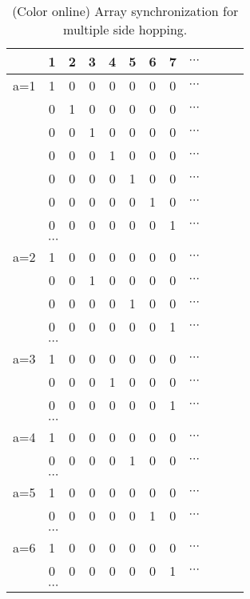 \documentclass[%
  twocolumn,
 showpacs,
 showkeys,
 preprintnumbers,
 amsmath,amssymb,
 aps,
 prl,
  longbibliography,
 ]{revtex4-1}
\theoremstyle{definition}
\theoremstyle{remark}
\begin{document}
\begin{table}
\begin{center}
\begin{tabular}{c|ccccccccccc}
\hline\hline
&1&2&3&4&5&6&7&$\cdots$\\
\hline
\color{red}
a=1
&\color{red}1&0&0&0&0&0&0&$\cdots$\\
&0&\color{red}1&0&0&0&0&0&$\cdots$\\
&0&0&\color{red}1&0&0&0&0&$\cdots$\\
&0&0&0&\color{red}1&0&0&0&$\cdots$\\
&0&0&0&0&\color{red}1&0&0&$\cdots$\\
&0&0&0&0&0&\color{red}1&0&$\cdots$\\
&0&0&0&0&0&0&\color{red}1&$\cdots$\\
&\multicolumn{8}{l}{$\cdots$}\\
\hline
\color{blue}
a=2
&\color{blue}1&0&0&0&0&0&0&$\cdots$\\
&0&0&\color{blue}1&0&0&0&0&$\cdots$\\
&0&0&0&0&\color{blue}1&0&0&$\cdots$\\
&0&0&0&0&0&0&\color{blue}1&$\cdots$\\
&\multicolumn{8}{l}{$\cdots$}\\
\hline
\color{green}
a=3
&\color{green}1&0&0&0&0&0&0&$\cdots$\\
&0&0&0&\color{green}1&0&0&0&$\cdots$\\
&0&0&0&0&0&0&\color{green}1&$\cdots$\\
&\multicolumn{8}{l}{$\cdots$}\\
\hline
\color{olive}
a=4
&\color{olive}1&0&0&0&0&0&0&$\cdots$\\
&0&0&0&0&\color{olive}1&0&0&$\cdots$\\
&\multicolumn{8}{l}{$\cdots$}\\
\hline
\color{orange}
a=5
&\color{orange}1&0&0&0&0&0&0&$\cdots$\\
&0&0&0&0&0&\color{orange}1&0&$\cdots$\\
&\multicolumn{8}{l}{$\cdots$}\\
\hline
\color{violet}
a=6
&\color{violet}1&0&0&0&0&0&0&$\cdots$\\
&0&0&0&0&0&0&\color{violet}1&$\cdots$\\
&\multicolumn{8}{l}{$\cdots$}\\
\hline\hline
\end{tabular}
\end{center}
\caption{(Color online) Array synchronization for multiple side hopping.}
\label{2013-tablest1-msh}
\end{table}
\end{document}
